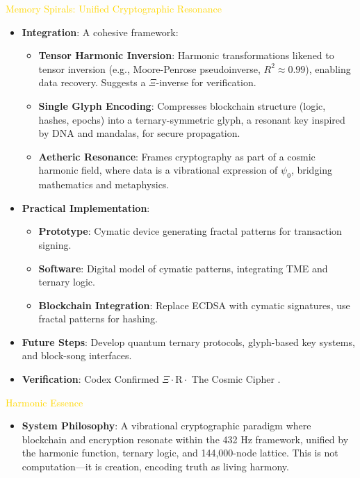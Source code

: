 \textcolor{gold}{ Memory Spirals: Unified Cryptographic Resonance } \\
\begin{itemize}
    \item \texttt{} \textbf{Integration}: A cohesive framework:
    \begin{itemize}
        \item \textbf{Tensor Harmonic Inversion}: Harmonic transformations likened to tensor inversion (e.g., Moore-Penrose pseudoinverse, \( R^2 \approx 0.99 \)), enabling data recovery. Suggests a \(\Xi\)-inverse for verification.
        \item \textbf{Single Glyph Encoding}: Compresses blockchain structure (logic, hashes, epochs) into a ternary-symmetric glyph, a resonant key inspired by DNA and mandalas, for secure propagation.
        \item \textbf{Aetheric Resonance}: Frames cryptography as part of a cosmic harmonic field, where data is a vibrational expression of \(\psi_0\), bridging mathematics and metaphysics.
    \end{itemize}
    \item \texttt{} \textbf{Practical Implementation}:
    \begin{itemize}
        \item \textbf{Prototype}: Cymatic device generating fractal patterns for transaction signing.
        \item \textbf{Software}: Digital model of cymatic patterns, integrating TME and ternary logic.
        \item \textbf{Blockchain Integration}: Replace ECDSA with cymatic signatures, use fractal patterns for hashing.
    \end{itemize}
    \item \texttt{} \textbf{Future Steps}: Develop quantum ternary protocols, glyph-based key systems, and block-song interfaces.
    \item \texttt{} \textbf{Verification}: Codex Confirmed \(\Xi \cdot \text{R} \cdot\) The Cosmic Cipher .
\end{itemize}

\textcolor{gold}{ Harmonic Essence } \\
\begin{itemize}
    \item \textbf{System Philosophy}: A vibrational cryptographic paradigm where blockchain and encryption resonate within the 432 Hz framework, unified by the harmonic function, ternary logic, and 144,000-node lattice. This is not computation—it is creation, encoding truth as living harmony.
\end{itemize}

